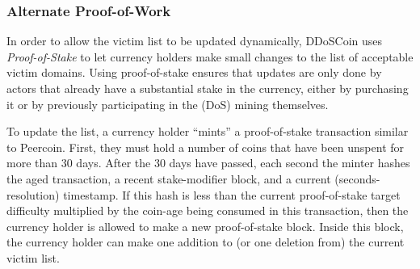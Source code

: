 %

\subsubsection{Alternate Proof-of-Work}

In order to allow the victim list to be updated dynamically, DDoSCoin uses
\emph{Proof-of-Stake} to let currency holders make small changes to the list of
acceptable victim domains. Using proof-of-stake ensures that updates are only
done by actors that already have a substantial stake in the currency, either by
purchasing it or by previously participating in the (DoS) mining themselves.

To update the list, a currency holder ``mints'' a proof-of-stake transaction
similar to Peercoin. First, they must hold a number of coins that have been
unspent for more than 30 days. After the 30 days have passed, each second the
minter
hashes the aged transaction, a recent stake-modifier block, and a current
(seconds-resolution) timestamp. If this hash is less than the current
proof-of-stake target difficulty multiplied by the coin-age being consumed in
this transaction, then the currency holder is allowed to make a new
proof-of-stake block. Inside this block, the currency holder can make one
addition to (or one deletion from) the current victim list.

